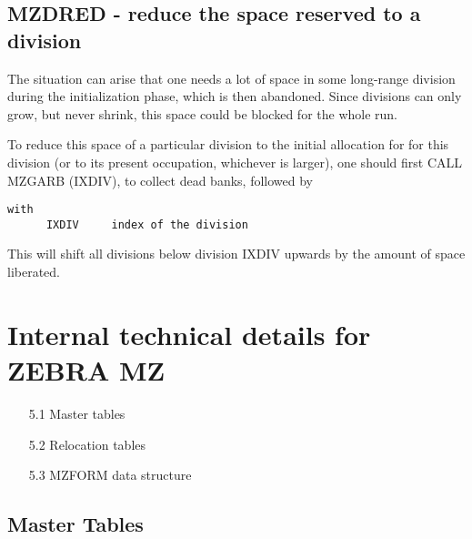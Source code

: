 \section{MZDRED - reduce the space reserved to a division}

The situation can arise that one needs a lot of space in some
long-range division during the initialization phase,
which is then abandoned.
Since divisions can only grow, but never shrink, this space
could be blocked for the whole run.

To reduce this space of a particular division
to the initial allocation for for this division
(or to its present occupation, whichever is larger),
one should first CALL MZGARB (IXDIV), to collect dead banks,
followed by


\begin{verbatim}
with
      IXDIV     index of the division

\end{verbatim} 

This will shift all divisions below division IXDIV upwards
by the amount of space liberated.
\chapter{Internal technical details for ZEBRA MZ}

\vspace{20mm}
  \begin{itemize}
     \in{30mm}
     \item[5.1] Master tables
     \item[5.2] Relocation tables
     \item[5.3] MZFORM data structure
  \end{itemize}

\section{Master Tables}

